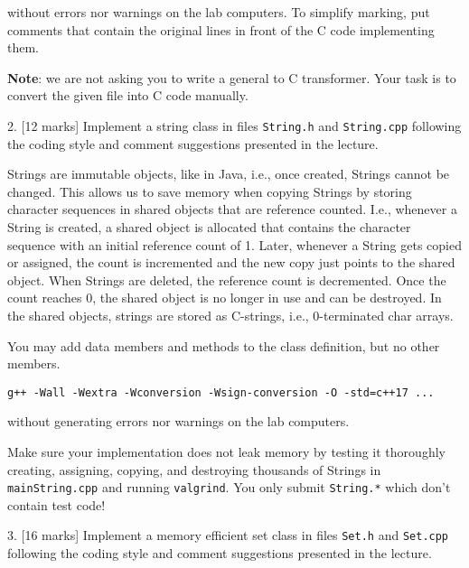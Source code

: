\documentclass[a4paper,11pt]{article}
\begin{document}
without errors nor warnings on the lab computers. To simplify marking, put
comments that contain the original {\CC} lines in front of the C code
implementing them.

\medskip

\textbf{Note}: we are not asking you to write a general {\CC} to C transformer. Your task
is to convert the given file into C code manually.

\bigskip

\linerule

\bigskip

2. [12 marks] Implement a {\CC} string class in files \texttt{String.h} and \texttt{String.cpp}
following the coding style and comment suggestions presented in the
lecture.

Strings are immutable objects, like in Java, i.e., once created, Strings
cannot be changed. This allows us to save memory when copying Strings by
storing character sequences in shared objects that are reference
counted. I.e., whenever a String is created, a shared object is allocated that
contains the character sequence with an initial reference count of 1. Later,
whenever a String gets copied or assigned, the count is incremented and the
new copy just points to the shared object. When Strings are deleted, the
reference count is decremented. Once the count reaches 0, the shared object is
no longer in use and can be destroyed. In the shared objects, strings are
stored as C-strings, i.e., 0-terminated char arrays.

\medskip 

You may add   data members and  methods to the class
definition, but no other members.

\begin{center}
    \texttt{g++ -Wall -Wextra -Wconversion -Wsign-conversion -O -std=c++17 ...}
\end{center}
without generating errors nor warnings on the lab computers.

\medskip

Make sure your implementation does not leak memory by testing it thoroughly
creating, assigning, copying, and destroying thousands of Strings in
\texttt{mainString.cpp} and running \texttt{valgrind}. You only submit \texttt{String.*} which don't
contain test code!

\bigskip

\linerule

\bigskip

3. [16 marks] Implement a memory efficient set class in files \texttt{Set.h} and
\texttt{Set.cpp} following the coding style and comment suggestions presented in the
lecture.
\end{document}
